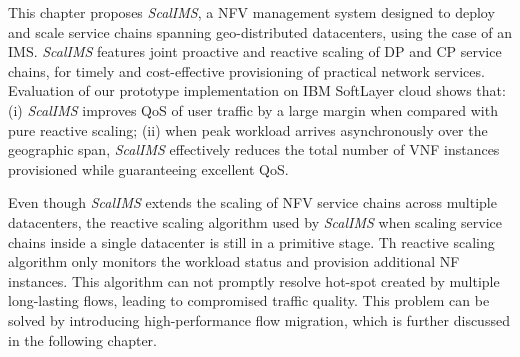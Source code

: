 This chapter proposes \textit{ScalIMS}, a NFV management system designed to deploy and scale service chains spanning geo-distributed datacenters, using the case of an IMS. \textit{ScalIMS} features joint proactive and reactive scaling of DP and CP service chains, for timely and cost-effective provisioning of practical network services. Evaluation of our prototype implementation on IBM SoftLayer cloud shows that: (i) \textit{ScalIMS} improves QoS of user traffic by a large margin when compared with pure reactive scaling; (ii) when peak workload arrives asynchronously over the geographic span, \textit{ScalIMS} effectively reduces the total number of VNF instances provisioned while guaranteeing excellent QoS. %

Even though \textit{ScalIMS} extends the scaling of NFV service chains across multiple datacenters, the reactive scaling algorithm used by \textit{ScalIMS} when scaling service chains inside a single datacenter is still in a primitive stage. Th reactive scaling algorithm only monitors the workload status and provision additional NF instances. This algorithm can not promptly resolve hot-spot created by multiple long-lasting flows, leading to compromised traffic quality. This problem can be solved by introducing high-performance flow migration, which is further discussed in the following chapter.

